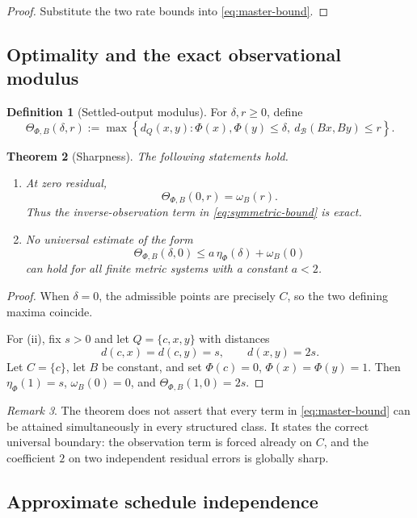 \documentclass[11pt]{article}
\newtheorem{theorem}{Theorem}[section]
\theoremstyle{definition}
\newtheorem{definition}[theorem]{Definition}
\theoremstyle{remark}
\newtheorem{remark}[theorem]{Remark}
\numberwithin{equation}{section}
\newcommand{\cB}{\mathcal B}
\begin{document}
\begin{proof}
Substitute the two rate bounds into \eqref{eq:master-bound}.
\end{proof}

\subsection{Optimality and the exact observational modulus}

\begin{definition}[Settled-output modulus]
For $\delta,r\ge0$, define
\[
 \Theta_{\Phi,B}(\delta,r):=
 \max\left\{
 d_Q(x,y):\Phi(x),\Phi(y)\le\delta,
 \ d_{\cB}(Bx,By)\le r
 \right\}.
\]
\end{definition}

\begin{theorem}[Sharpness]\label{thm:sharpness}
The following statements hold.
\begin{enumerate}[label=(\roman*)]
\item At zero residual,
\[
 \Theta_{\Phi,B}(0,r)=\omega_B(r).
\]
Thus the inverse-observation term in \eqref{eq:symmetric-bound} is exact.
\item No universal estimate of the form
\[
 \Theta_{\Phi,B}(\delta,0)\le a\,\eta_\Phi(\delta)+\omega_B(0)
\]
can hold for all finite metric systems with a constant $a<2$.
\end{enumerate}
\end{theorem}

\begin{proof}
When $\delta=0$, the admissible points are precisely $C$, so the two defining maxima coincide.

For (ii), fix $s>0$ and let $Q=\{c,x,y\}$ with distances
\[
 d(c,x)=d(c,y)=s,\qquad d(x,y)=2s.
\]
Let $C=\{c\}$, let $B$ be constant, and set $\Phi(c)=0$, $\Phi(x)=\Phi(y)=1$.  Then $\eta_\Phi(1)=s$, $\omega_B(0)=0$, and $\Theta_{\Phi,B}(1,0)=2s$.
\end{proof}

\begin{remark}
The theorem does not assert that every term in \eqref{eq:master-bound} can be attained simultaneously in every structured class.  It states the correct universal boundary: the observation term is forced already on $C$, and the coefficient $2$ on two independent residual errors is globally sharp.
\end{remark}

\subsection{Approximate schedule independence}
\end{document}
